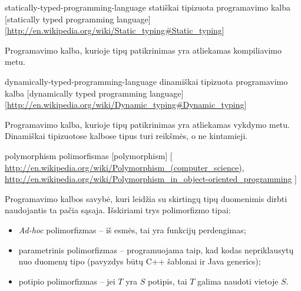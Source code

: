 \begin{glossary}
\begin{entry}
  \end{entry}

  \begin{entry}%
    {statically-typed-programming-language}%
    {statiškai tipizuota programavimo kalba}%
    [statically typed programming language]%
    [\url{http://en.wikipedia.org/wiki/Static_typing\#Static_typing}]

    Programavimo kalba, kurioje tipų patikrinimas yra atliekamas
    kompiliavimo metu.
    
  \end{entry}

  \begin{entry}%
    {dynamically-typed-programming-language}%
    {dinamiškai tipizuota programavimo kalba}%
    [dynamically typed programming language]%
    [\url{http://en.wikipedia.org/wiki/Dynamic_typing\#Dynamic_typing}]

    Programavimo kalba, kurioje tipų patikrinimas yra atliekamas vykdymo
    metu. Dinamiškai tipizuotose kalbose tipus turi reikšmės, o ne
    kintamieji.
    
  \end{entry}

  \begin{entry}%
    {polymorphism}%
    {polimorfismas}%
    [polymorphism]%
    [%
    \url{http://en.wikipedia.org/wiki/Polymorphism_(computer_science)}, %
    \url{http://en.wikipedia.org/wiki/Polymorphism_in_object-oriented_programming}%
    ]%

    Programavimo kalbos savybė, kuri leidžia su skirtingų tipų duomenimis
    dirbti naudojantis ta pačia sąsaja. Išskiriami trys polimorfizmo tipai:
    \begin{itemize}
      \item \emph{Ad-hoc} polimorfizmas  –
        iš esmės, tai yra funkcijų perdengimas;
      \item parametrinis polimorfizmas  –
        programuojama taip, kad kodas nepriklausytų nuo duomenų tipo
        (pavyzdys būtų C++ šablonai ir Java generics);
      \item potipio polimorfizmas  – 
        jei $T$ yra $S$ potipis, tai $T$ galima naudoti vietoje $S$.
    \end{itemize}
    
  \end{entry}
\end{glossary}

